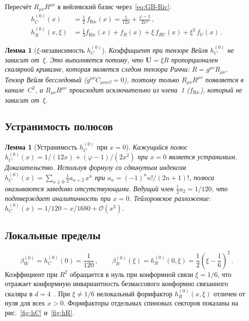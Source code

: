 \documentclass[aps,prd,twocolumn,superscriptaddress,nofootinbib,floatfix]{revtex4-2}
\newtheorem{lemma}[theorem]{\cyrillicfont Лемма}
\theoremstyle{definition}
\theoremstyle{remark}
\newcommand{\Ricsq}{R_{\mu\nu}R^{\mu\nu}}
\begin{document}
Пересчёт $\Ricsq$ в вейлевский базис через~\eqref{eq:GB-Ric}:
\begin{subequations}
\label{eq:scalar-ff}
\begin{align}
  h_C^{(0)}(x) &= \tfrac{1}{2}\,f_{\text{Ric}}(x)
    = \frac{1}{12x} + \frac{\varphi - 1}{2x^2}\,,
  \label{eq:hC0}\\
  h_R^{(0)}(x,\xi) &= \tfrac{1}{3}f_{\text{Ric}}(x) + f_R(x)
    + \xi\,f_{RU}(x) + \xi^2\,f_U(x)\,.
  \label{eq:hR0}
\end{align}
\end{subequations}

\begin{lemma}[$\xi$-независимость $h_C^{(0)}$]
\label{lem:xi-indep}
Коэффициент при тензоре Вейля $h_C^{(0)}$ не зависит от~$\xi$. Это
выполняется потому, что $\mathbf{U} = \xi R$ пропорционален скалярной
кривизне, которая является следом тензора Риччи:
$R = g^{\mu\nu}R_{\mu\nu}$. Тензор Вейля бесследовый
($g^{\mu\nu}C_{\mu\alpha\nu\beta} = 0$), поэтому только $\Ricsq$
появляется в канале~$C^2$, а $\Ricsq$ происходит исключительно из
члена~1 ($f_{\text{Ric}}$), который не зависит от~$\xi$.
\end{lemma}

\subsection{Устранимость полюсов}

\begin{lemma}[Устранимость $h_C^{(0)}$ при $x = 0$]
\label{lem:pole-scalar}
Кажущийся полюс $h_C^{(0)}(x) = 1/(12x) + (\varphi - 1)/(2x^2)$ при
$x = 0$ является устранимым. \emph{Доказательство.} Используя формулу
со сдвинутым индексом
$h_C^{(0)}(x) = \sum_{n \geq 0}\tfrac{1}{2}a_{n+2}\,x^n$ при
$a_n = (-1)^n n!/(2n+1)!$, полюса оказываются заведомо отсутствующими.
Ведущий член $\tfrac{1}{2}a_2 = 1/120$, что подтверждает аналитичность
при $x = 0$. Тейлоровское разложение:
$h_C^{(0)}(x) = 1/120 - x/1680 + \mathcal{O}(x^2)$.
\end{lemma}

\subsection{Локальные пределы}

\begin{equation}
  \beta_W^{(0)} = h_C^{(0)}(0) = \frac{1}{120}\,,\qquad
  \beta_R^{(0)}(\xi) = h_R^{(0)}(0,\xi)
    = \frac{1}{2}\!\left(\xi - \frac{1}{6}\right)^{\!2}\,.
  \label{eq:beta-scalar}
\end{equation}
Коэффициент при $R^2$ обращается в нуль при конформной связи $\xi = 1/6$,
что отражает конформную инвариантность безмассового конформно связанного
скаляра в $d = 4$~\cite{Parker:2009uva}. При $\xi \neq 1/6$ нелокальный
формфактор $h_R^{(0)}(x, \xi)$ отличен от нуля для всех $x > 0$.
Формфакторы отдельных спиновых секторов показаны на
рис.~\ref{fig:hC} и~\ref{fig:hR}.
\end{document}
